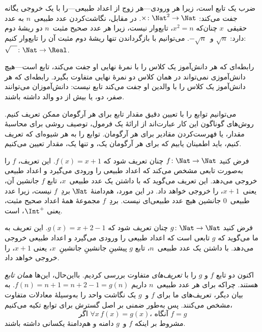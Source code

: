 \documentclass[../../../include/open-logic-section]{subfiles}
\begin{document}
\begin{ex}
ضرب یک تابع است، زیرا هر ورودی---هر زوج
از اعداد طبیعی---را با یک خروجی یگانه جفت می‌کند: $\times \colon \Nat^2 \to
\Nat$. در مقابل، نگاشت‌کردن عدد طبیعی~$n$ به عدد حقیقی~$x$ چنان‌که
$x^2 = n$، تابع‌وار نیست، زیرا هر عدد صحیح مثبت~$n$ دو
ریشهٔ دوم دارد: $\sqrt{n}$ و~$-\sqrt{n}$. می‌توانیم با
بازگرداندن تنها ریشهٔ دوم مثبت آن را تابع‌وار کنیم: $\sqrt{\phantom{X}} \colon
\Nat \to \Real$.
\end{ex}

\begin{ex}
رابطه‌ای که هر دانش‌آموز یک کلاس را با نمرهٔ نهایی او جفت می‌کند،
تابع است---هیچ دانش‌آموزی نمی‌تواند در همان
کلاس دو نمرهٔ نهایی متفاوت بگیرد. رابطه‌ای که هر دانش‌آموز یک کلاس را با
والدین او جفت می‌کند تابع نیست: دانش‌آموزان می‌توانند صفر، دو، یا بیش از
دو والد داشته باشند.
\end{ex}

\begin{explain}
می‌توانیم توابع را با تعیین دقیق مقدار تابع برای
هر آرگومان ممکن تعریف کنیم. روش‌های گوناگون این کار عبارت‌اند از
ارائهٔ یک فرمول، توصیف روشی برای محاسبهٔ
مقدار، یا فهرست‌کردن مقادیر برای هر آرگومان. توابع را به هر شیوه‌ای که
تعریف کنیم، باید اطمینان یابیم که برای هر آرگومان یک،
و تنها یک، مقدار تعیین می‌کنیم.
\end{explain}


\begin{ex}
فرض کنید $f \colon \Nat \to \Nat$ چنان تعریف شود که $f(x) = x+1$. این
تعریف، $f$ را به‌صورت تابعی مشخص می‌کند که
اعداد طبیعی را ورودی می‌گیرد و اعداد طبیعی خروجی می‌دهد. این تعریف می‌گوید که با داشتن یک
عدد طبیعی~$x$، تابع $f$ جانشین آن، یعنی~$x+1$، را خروجی خواهد داد.
در این مورد، هم‌دامنهٔ $\Nat$ بردِ~$f$ نیست، زیرا
عدد طبیعی~$0$ جانشین هیچ عدد طبیعی‌ای نیست.
بردِ~$f$ مجموعهٔ همهٔ اعداد صحیح مثبت، یعنی $\Int^{+}$، است.
\end{ex}

\begin{ex}
فرض کنید $g \colon \Nat \to \Nat$ چنان تعریف شود که $g(x) = x+2-1$. این
تعریف به ما می‌گوید که $g$ تابعی است که اعداد طبیعی را ورودی می‌گیرد و
اعداد طبیعی خروجی می‌دهد. با داشتن یک عدد طبیعی~$n$، تابع $g$
پیشینِ جانشینِ جانشینِ~$x$، یعنی
$x+1$، را خروجی خواهد داد.
\end{ex}

\begin{explain}
اکنون دو تابع $f$ و $g$ را با \emph{تعریف‌های} متفاوت بررسی کردیم.
بااین‌حال، این‌ها \emph{همان تابع} هستند. چراکه
برای هر عدد طبیعی~$n$ داریم $f(n) = n+1 = n+2-1 =
g(n)$. به بیان دیگر، تعریف‌های ما برای $f$ و~$g$ یک
نگاشت واحد را به‌وسیلهٔ معادلات متفاوت مشخص می‌کنند. پس به‌طور ضمنی
بر اصل گسترش برای توابع تکیه می‌کنیم،
\[
  \text{اگر }\forall x\, f(x) = g(x)\text{، آنگاه }f = g
\]
مشروط بر اینکه $f$ و~$g$ دامنه و هم‌دامنهٔ یکسانی داشته باشند.
\end{explain}
\end{document}
